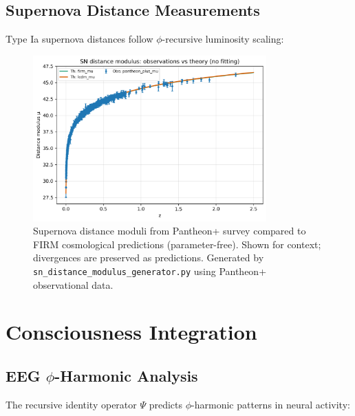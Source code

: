 \documentclass[12pt]{article}
\begin{document}
\subsection{Supernova Distance Measurements}

Type Ia supernova distances follow $\phi$-recursive luminosity scaling:

\begin{figure}[H]
    \centering
    \includegraphics[width=0.8\textwidth]{figures/sn_mu_comparison.png}
    \caption{Supernova distance moduli from Pantheon+ survey compared to FIRM cosmological predictions (parameter-free). Shown for context; divergences are preserved as predictions. Generated by \texttt{sn\_distance\_modulus\_generator.py} using Pantheon+ observational data.}
    \label{fig:sn_distances}
\end{figure}

\section{Consciousness Integration}

\subsection{EEG $\phi$-Harmonic Analysis}

The recursive identity operator $\Psi$ predicts $\phi$-harmonic patterns in neural activity:
\end{document}
